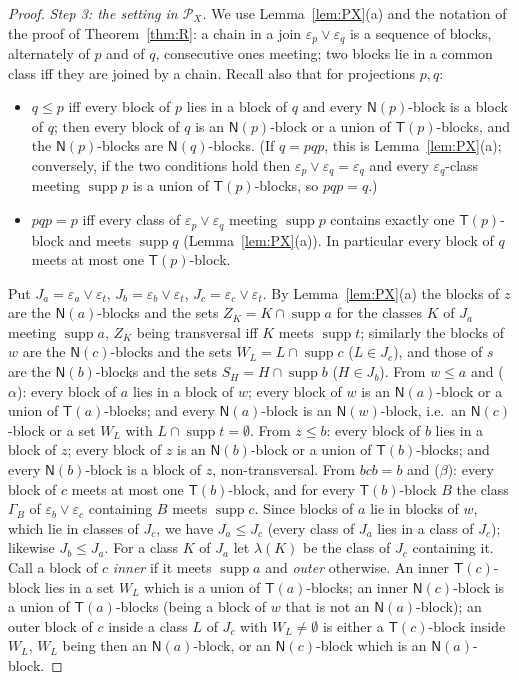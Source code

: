 \documentclass[11pt]{amsart}
\theoremstyle{definition}
\renewcommand{\P}{\mathcal{P}}
\newcommand{\supp}{\operatorname{supp}}
\newcommand{\T}{\mathsf{T}}
\newcommand{\N}{\mathsf{N}}
\begin{document}
\begin{proof}
\smallskip
\emph{Step 3: the setting in $\P_X$.} We use Lemma~\ref{lem:PX}(a) and the notation of the proof of Theorem~\ref{thm:R}: a chain in a join $\varepsilon_p\vee\varepsilon_q$ is a sequence of blocks, alternately of $p$ and of $q$, consecutive ones meeting; two blocks lie in a common class iff they are joined by a chain. Recall also that for projections $p,q$:
\begin{itemize}[nosep]
\item[($\alpha$)] $q\le p$ iff every block of $p$ lies in a block of $q$ and every $\N(p)$-block is a block of $q$; then every block of $q$ is an $\N(p)$-block or a union of $\T(p)$-blocks, and the $\N(p)$-blocks are $\N(q)$-blocks. (If $q=pqp$, this is Lemma~\ref{lem:PX}(a); conversely, if the two conditions hold then $\varepsilon_p\vee\varepsilon_q=\varepsilon_q$ and every $\varepsilon_q$-class meeting $\supp p$ is a union of $\T(p)$-blocks, so $pqp=q$.)
\item[($\beta$)] $pqp=p$ iff every class of $\varepsilon_p\vee\varepsilon_q$ meeting $\supp p$ contains exactly one $\T(p)$-block and meets $\supp q$ (Lemma~\ref{lem:PX}(a)). In particular every block of $q$ meets at most one $\T(p)$-block.
\end{itemize}
Put $J_a=\varepsilon_a\vee\varepsilon_t$, $J_b=\varepsilon_b\vee\varepsilon_t$, $J_c=\varepsilon_c\vee\varepsilon_t$. By Lemma~\ref{lem:PX}(a) the blocks of $z$ are the $\N(a)$-blocks and the sets $Z_K=K\cap\supp a$ for the classes $K$ of $J_a$ meeting $\supp a$, $Z_K$ being transversal iff $K$ meets $\supp t$; similarly the blocks of $w$ are the $\N(c)$-blocks and the sets $W_L=L\cap\supp c$ ($L\in J_c$), and those of $s$ are the $\N(b)$-blocks and the sets $S_H=H\cap\supp b$ ($H\in J_b$). From $w\le a$ and ($\alpha$): every block of $a$ lies in a block of $w$; every block of $w$ is an $\N(a)$-block or a union of $\T(a)$-blocks; and every $\N(a)$-block is an $\N(w)$-block, i.e.\ an $\N(c)$-block or a set $W_L$ with $L\cap\supp t=\emptyset$. From $z\le b$: every block of $b$ lies in a block of $z$; every block of $z$ is an $\N(b)$-block or a union of $\T(b)$-blocks; and every $\N(b)$-block is a block of $z$, non-transversal. From $bcb=b$ and ($\beta$): every block of $c$ meets at most one $\T(b)$-block, and for every $\T(b)$-block $B$ the class $\Gamma_B$ of $\varepsilon_b\vee\varepsilon_c$ containing $B$ meets $\supp c$. Since blocks of $a$ lie in blocks of $w$, which lie in classes of $J_c$, we have $J_a\le J_c$ (every class of $J_a$ lies in a class of $J_c$); likewise $J_b\le J_a$. For a class $K$ of $J_a$ let $\lambda(K)$ be the class of $J_c$ containing it. Call a block of $c$ \emph{inner} if it meets $\supp a$ and \emph{outer} otherwise. An inner $\T(c)$-block lies in a set $W_L$ which is a union of $\T(a)$-blocks; an inner $\N(c)$-block is a union of $\T(a)$-blocks (being a block of $w$ that is not an $\N(a)$-block); an outer block of $c$ inside a class $L$ of $J_c$ with $W_L\ne\emptyset$ is either a $\T(c)$-block inside $W_L$, $W_L$ being then an $\N(a)$-block, or an $\N(c)$-block which is an $\N(a)$-block.


\end{proof}
\end{document}

